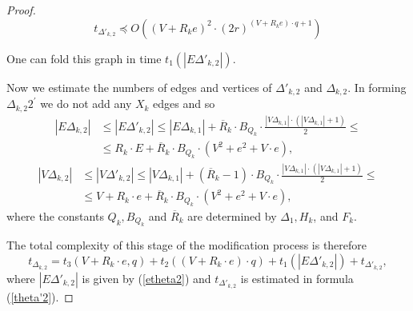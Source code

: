 \documentclass[a4paper,12pt]{article}
\newcommand{\G}{\Gamma }
\newcommand{\D}{\Delta }
\newcommand{\T}{\Theta }
\newcommand{\cP}{{\cal{P}}}
\numberwithin{equation}{section}
\numberwithin{figure}{section}
\begin{document}
\begin{proof}
\begin{equation}\label{theta'2}
t_{\D'_{k,2}} \preceq O((V + R_k e)^2\cdot (2r)^{(V +
R_k e)\cdot q +1})
\end{equation}

One can fold this graph in time $t_1(|E\D'_{k,2}|)$.

Now we estimate the numbers of edges  and vertices  of $\D'_{k,2}$ and
$\D_{k,2}$. In forming $\D_{k,2}2^\prime$  we do not add any $X_k$ edges
and so
\begin{equation}\label{etheta2}
\begin{split}
|E\D_{k,2}| &\le |E\D'_{k,2}| \le |E\D_{k,1}|+\overline{R}_k\cdot B_{Q_k}
\cdot \frac{|V\D_{k,1}|\cdot(|V\D_{k,1}|+1)}{2}\le\\
&\le R_k \cdot E +
\overline{R}_k\cdot B_{Q_k} \cdot (V^2 + e^2+V\cdot e),
\end{split}
\end{equation}
\begin{equation}\label{vtheta2}
\begin{split}
|V\D_{k,2}| &\le |V \D'_{k,2}| \le |V\D_{k,1}|+(\overline{R}_k-1)\cdot B_{Q_k}
\cdot \frac{|V\D_{k,1}|\cdot(|V\D_{k,1}|+1)}{2}\le\\ &\le V + R_k \cdot e +
\overline{R}_k \cdot B_{Q_k}\cdot (V^2 + e^2+V\cdot e),
\end{split}
\end{equation}
where the constants $Q_k, B_{Q_k}$ and  $\overline{R}_k$ are determined  by $\D_1,
H_k$, and $F_k$.


The total complexity of this stage of the modification process is
therefore
\begin{equation}\label{theta2}
t_{\D_{k,2}} = t_3(V + R_k \cdot e, q) + t_2((V + R_k \cdot e) \cdot
q)+ t_1(|E\D'_{k,2}|) + t_{\D'_{k,2}},
\end{equation}
where $|E\D'_{k,2}|$ is given by (\ref{etheta2}) and $t_{\D'_{k,2}}$ is
estimated in formula (\ref{theta'2}).


\end{proof}
\end{document}
